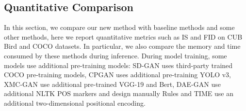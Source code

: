 \documentclass[runningheads, orivec]{llncs}
\begin{document}
\vspace{-10pt}
\subsection{Quantitative Comparison}

In this section, we compare our new method with baseline methods and some other methods, here we report quantitative metrics such as IS and FID on CUB Bird\cite{WahCUB_200_2011} and COCO datasets\cite{lin2014microsoft}. In particular, we also compare the memory and time consumed by these methods during inference. During model training, some models use additional pre-training models: SD-GAN\cite{yin2019semantics} uses third-party trained COCO pre-training models\cite{rombach2021highresolution}, CPGAN\cite{liang2020cpgan} uses additional pre-training YOLO v3\cite{farhadi2018yolov3}, XMC-GAN\cite{zhang2021cross} use additional pre-trained VGG-19\cite{simonyan2014very} and Bert\cite{devlin2018bert}, DAE-GAN use additional NLTK POS markers and design manually Rules and TIME use an additional two-dimensional positional encoding.
\end{document}

